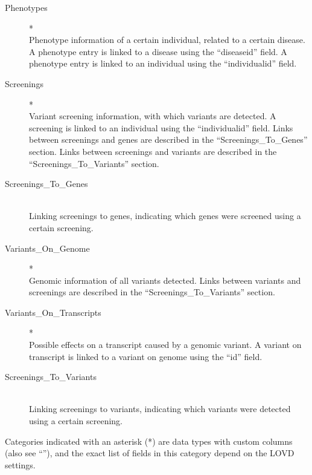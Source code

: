 \begin{description}
  \item[Phenotypes]* \hfill \\
    Phenotype information of a certain individual, related to a certain disease.
    A phenotype entry is linked to a disease using the ``diseaseid'' field.
    A phenotype entry is linked to an individual using the ``individualid'' field.
  \item[Screenings]* \hfill \\
    Variant screening information, with which variants are detected.
    A screening is linked to an individual using the ``individualid'' field.
    Links between screenings and genes are described in the ``Screenings\_To\_Genes'' section.
    Links between screenings and variants are described in the ``Screenings\_To\_Variants'' section.
  \item[Screenings\_To\_Genes] \hfill \\
    Linking screenings to genes, indicating which genes were screened using a certain screening.
  \item[Variants\_On\_Genome]* \hfill \\
    Genomic information of all variants detected.
    Links between variants and screenings are described in the ``Screenings\_To\_Variants'' section.
  \item[Variants\_On\_Transcripts]* \hfill \\
    Possible effects on a transcript caused by a genomic variant.
    A variant on transcript is linked to a variant on genome using the ``id'' field.
  \item[Screenings\_To\_Variants] \hfill \\
    Linking screenings to variants, indicating which variants were detected using a certain screening.
\end{description}
\noindent
Categories indicated with an asterisk (*) are data types with custom columns
 (also see ``''),
 and the exact list of fields in this category depend on the LOVD settings.

